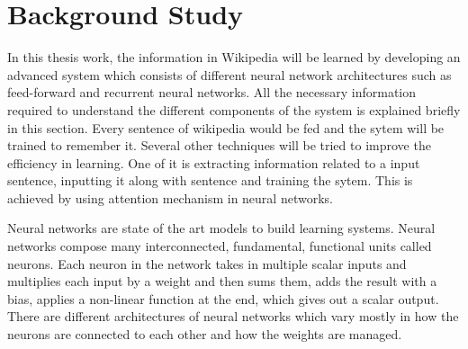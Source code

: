 \documentclass[a4paper, 11pt]{article}
\begin{document}

  





\section{Background Study}

In this thesis work, the information in Wikipedia will be learned by developing an advanced system which consists of different neural network architectures such as feed-forward and recurrent neural networks. All the necessary information required to understand the different components of the system is explained briefly in this section. Every sentence of wikipedia would be fed and the sytem will be trained to remember it. Several other techniques will be tried to improve the efficiency in learning. One of it is extracting information related to a input sentence, inputting it along with sentence and training the sytem. This is achieved by using attention mechanism in neural networks.

Neural networks are state of the art models to build learning systems. Neural networks compose many interconnected, fundamental, functional units called neurons. Each neuron in the network takes in multiple scalar inputs and multiplies each input by a weight and then sums them, adds the result with a bias, applies a non-linear function at the end, which gives out a scalar output. There are different architectures of neural networks which vary mostly in how the neurons are connected to each other and how the weights are managed. 
\end{document}
